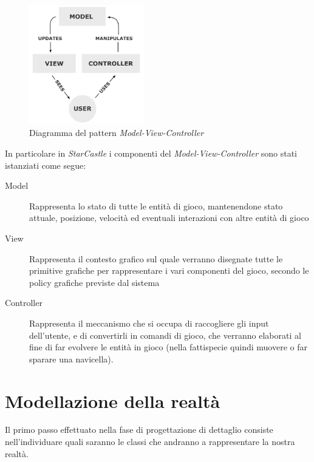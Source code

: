 \documentclass[a4paper,12pt]{article}
\begin{document}
\begin{figure}[h]
\centering
\includegraphics[width=5cm]{mvc.png}
\caption{Diagramma del pattern \emph{Model-View-Controller}}
\label{img:mvc}
\end{figure}

In particolare in \emph{StarCastle} i componenti del \emph{Model-View-Controller} sono stati istanziati come segue:

\begin{description}
\item[\textsf{Model}] Rappresenta lo stato di tutte le entit\`a di gioco, mantenendone stato attuale, posizione, velocit\`a ed eventuali interazioni con altre entit\`a di gioco
\item[\textsf{View}] Rappresenta il contesto grafico sul quale verranno disegnate tutte le primitive grafiche per rappresentare i vari componenti del gioco, secondo le policy grafiche previste dal sistema
\item[\textsf{Controller}] Rappresenta il meccanismo che si occupa di raccogliere gli input dell'utente, e di convertirli in comandi di gioco, che verranno elaborati al fine di far evolvere le entit\`a in gioco (nella fattispecie quindi muovere o far sparare una navicella).
\end{description}

\section{Modellazione della realt\`a}
\label{sec:stato}

Il primo passo effettuato nella fase di progettazione di dettaglio consiste nell'individuare quali saranno le classi che andranno a rappresentare la nostra realt\`a.
\end{document}
